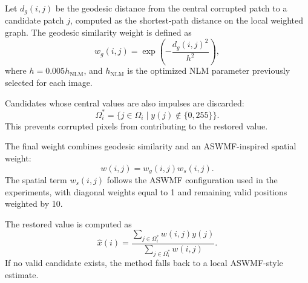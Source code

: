 \documentclass{ieeeaccess}
\begin{document}
Let $d_g(i,j)$ be the geodesic distance from the central corrupted patch to a candidate patch $j$, computed as the shortest-path distance on the local weighted graph. The geodesic similarity weight is defined as
\begin{equation}
w_g(i,j)=
\exp\left(
-\frac{d_g(i,j)^2}{h^2}
\right),
\label{eq:geodesic_weight}
\end{equation}
where $h=0.005h_{\mathrm{NLM}}$, and $h_{\mathrm{NLM}}$ is the optimized NLM parameter previously selected for each image.

Candidates whose central values are also impulses are discarded:
\begin{equation}
\Omega_i^{*} =
\{j \in \Omega_i \mid y(j) \notin \{0,255\}\}.
\label{eq:valid_candidates}
\end{equation}
This prevents corrupted pixels from contributing to the restored value.

The final weight combines geodesic similarity and an ASWMF-inspired spatial weight:
\begin{equation}
w(i,j) = w_g(i,j)w_s(i,j).
\label{eq:hybrid_weight}
\end{equation}
The spatial term $w_s(i,j)$ follows the ASWMF configuration used in the experiments, with diagonal weights equal to 1 and remaining valid positions weighted by 10.

The restored value is computed as
\begin{equation}
\hat{x}(i)=
\frac{\sum_{j\in\Omega_i^{*}}w(i,j)y(j)}
{\sum_{j\in\Omega_i^{*}}w(i,j)}.
\label{eq:hybrid_estimate}
\end{equation}
If no valid candidate exists, the method falls back to a local ASWMF-style estimate.
\end{document}
